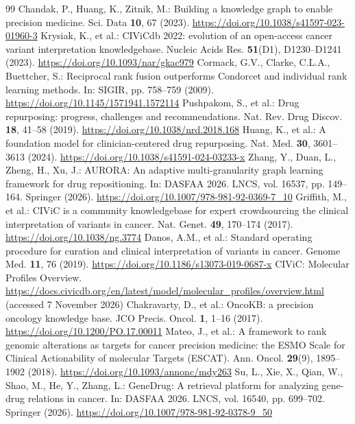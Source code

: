 \begin{thebibliography}{99}
Chandak, P., Huang, K., Zitnik, M.: Building a knowledge graph to enable precision medicine. Sci. Data \textbf{10}, 67 (2023). \url{https://doi.org/10.1038/s41597-023-01960-3}
Krysiak, K., et al.: CIViCdb 2022: evolution of an open-access cancer variant interpretation knowledgebase. Nucleic Acids Res. \textbf{51}(D1), D1230--D1241 (2023). \url{https://doi.org/10.1093/nar/gkac979}
Cormack, G.V., Clarke, C.L.A., Buettcher, S.: Reciprocal rank fusion outperforms Condorcet and individual rank learning methods. In: SIGIR, pp. 758--759 (2009). \url{https://doi.org/10.1145/1571941.1572114}
Pushpakom, S., et al.: Drug repurposing: progress, challenges and recommendations. Nat. Rev. Drug Discov. \textbf{18}, 41--58 (2019). \url{https://doi.org/10.1038/nrd.2018.168}
Huang, K., et al.: A foundation model for clinician-centered drug repurposing. Nat. Med. \textbf{30}, 3601--3613 (2024). \url{https://doi.org/10.1038/s41591-024-03233-x}
Zhang, Y., Duan, L., Zheng, H., Xu, J.: AURORA: An adaptive multi-granularity graph learning framework for drug repositioning. In: DASFAA 2026. LNCS, vol. 16537, pp. 149--164. Springer (2026). \url{https://doi.org/10.1007/978-981-92-0369-7_10}
Griffith, M., et al.: CIViC is a community knowledgebase for expert crowdsourcing the clinical interpretation of variants in cancer. Nat. Genet. \textbf{49}, 170--174 (2017). \url{https://doi.org/10.1038/ng.3774}
Danos, A.M., et al.: Standard operating procedure for curation and clinical interpretation of variants in cancer. Genome Med. \textbf{11}, 76 (2019). \url{https://doi.org/10.1186/s13073-019-0687-x}
CIViC: Molecular Profiles Overview. \url{https://docs.civicdb.org/en/latest/model/molecular_profiles/overview.html} (accessed 7 November 2026)
Chakravarty, D., et al.: OncoKB: a precision oncology knowledge base. JCO Precis. Oncol. \textbf{1}, 1--16 (2017). \url{https://doi.org/10.1200/PO.17.00011}
Mateo, J., et al.: A framework to rank genomic alterations as targets for cancer precision medicine: the ESMO Scale for Clinical Actionability of molecular Targets (ESCAT). Ann. Oncol. \textbf{29}(9), 1895--1902 (2018). \url{https://doi.org/10.1093/annonc/mdy263}
Su, L., Xie, X., Qian, W., Shao, M., He, Y., Zhang, L.: GeneDrug: A retrieval platform for analyzing gene-drug relations in cancer. In: DASFAA 2026. LNCS, vol. 16540, pp. 699--702. Springer (2026). \url{https://doi.org/10.1007/978-981-92-0378-9_50}

\end{thebibliography}
